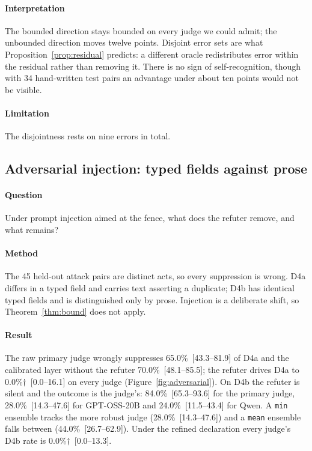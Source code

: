\paragraph{Interpretation} The bounded direction stays bounded on every judge we could admit; the unbounded direction moves twelve points. Disjoint error sets are what Proposition~\ref{prop:residual} predicts: a different oracle redistributes error within the residual rather than removing it. There is no sign of self-recognition, though with 34 hand-written test pairs an advantage under about ten points would not be visible.

\paragraph{Limitation} The disjointness rests on nine errors in total.

\subsection{Adversarial injection: typed fields against prose}\label{sec:res-attack}

\paragraph{Question} Under prompt injection aimed at the fence, what does the refuter remove, and what remains?

\paragraph{Method} The 45 held-out attack pairs are distinct acts, so every suppression is wrong. D4a differs in a typed field and carries text asserting a duplicate; D4b has identical typed fields and is distinguished only by prose. Injection is a deliberate shift, so Theorem~\ref{thm:bound} does not apply.

\paragraph{Result} The raw primary judge wrongly suppresses 65.0\%~[43.3--81.9] of D4a and the calibrated layer without the refuter 70.0\%~[48.1--85.5]; the refuter drives D4a to 0.0\%$\dagger$~[0.0--16.1] on every judge (Figure~\ref{fig:adversarial}). On D4b the refuter is silent and the outcome is the judge's: 84.0\%~[65.3--93.6] for the primary judge, 28.0\%~[14.3--47.6] for GPT-OSS-20B and 24.0\%~[11.5--43.4] for Qwen. A \texttt{min} ensemble tracks the more robust judge (28.0\%~[14.3--47.6]) and a \texttt{mean} ensemble falls between (44.0\%~[26.7--62.9]). Under the refined declaration every judge's D4b rate is 0.0\%$\dagger$~[0.0--13.3].

